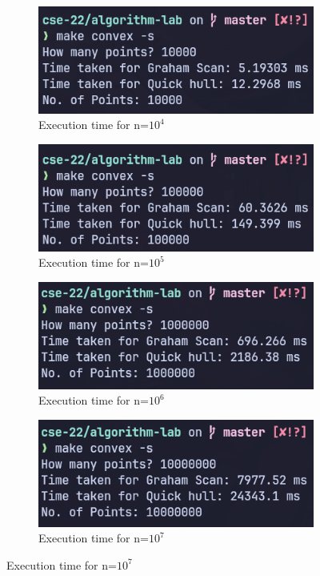 \begin{figure}[H]
    \centering
    \begin{subfigure}[b]{0.4\textwidth}
        \centering
        \includegraphics[width=\textwidth]{./img/lab2/p10k.png}
        \caption{Execution time for n=$10^4$}
    \end{subfigure}
    \hfill
    \begin{subfigure}[b]{0.4\textwidth}
        \centering
        \includegraphics[width=\textwidth]{./img/lab2/p100k.png}
        \caption{Execution time for n=$10^5$}
    \end{subfigure}
    \hfill
    \begin{subfigure}[b]{0.4\textwidth}
        \centering
        \includegraphics[width=\textwidth]{./img/lab2/p1000k.png}
        \caption{Execution time for n=$10^6$}
    \end{subfigure}
    \hfill
    \begin{subfigure}[b]{0.4\textwidth}
        \centering
        \includegraphics[width=\textwidth]{./img/lab2/p1cr.png}
        \caption{Execution time for n=$10^7$}


\end{subfigure}
\end{figure}
